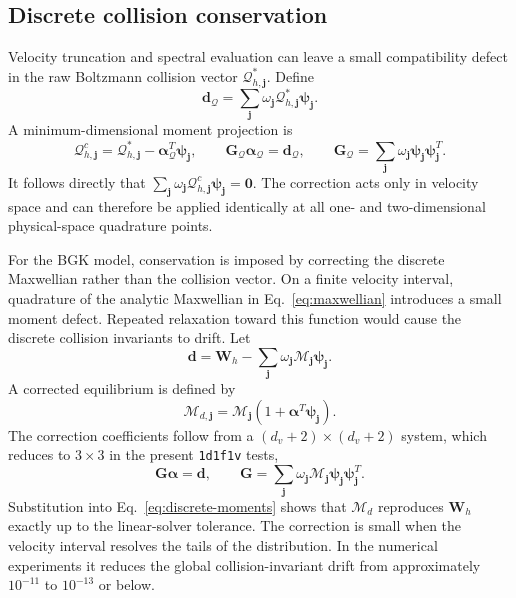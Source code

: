 \documentclass[preprint,3p,12pt]{elsarticle}
\newcommand{\vct}[1]{\boldsymbol{#1}}
\begin{document}
\subsection{Discrete collision conservation}
\label{sec:collision-conservation}

Velocity truncation and spectral evaluation can leave a small compatibility defect in the raw Boltzmann collision vector $\mathcal{Q}_{h,\vct{j}}^*$. Define
\begin{equation}
  \vct{d}_{\mathcal{Q}}
  =\sum_{\vct{j}}\omega_{\vct{j}}
  \mathcal{Q}_{h,\vct{j}}^*\vct{\psi}_{\vct{j}}.
  \label{eq:collision-defect}
\end{equation}
A minimum-dimensional moment projection is
\begin{equation}
  \mathcal{Q}_{h,\vct{j}}^c
  =\mathcal{Q}_{h,\vct{j}}^*
  -\vct{\alpha}_{\mathcal{Q}}^T\vct{\psi}_{\vct{j}},
  \qquad
  \vct{G}_{\mathcal{Q}}\vct{\alpha}_{\mathcal{Q}}
  =\vct{d}_{\mathcal{Q}},
  \qquad
  \vct{G}_{\mathcal{Q}}
  =\sum_{\vct{j}}\omega_{\vct{j}}
  \vct{\psi}_{\vct{j}}\vct{\psi}_{\vct{j}}^T.
  \label{eq:collision-projection}
\end{equation}
It follows directly that $\sum_{\vct{j}}\omega_{\vct{j}}\mathcal{Q}_{h,\vct{j}}^c\vct{\psi}_{\vct{j}}=\vct{0}$. The correction acts only in velocity space and can therefore be applied identically at all one- and two-dimensional physical-space quadrature points.

For the BGK model, conservation is imposed by correcting the discrete Maxwellian rather than the collision vector. On a finite velocity interval, quadrature of the analytic Maxwellian in Eq.~\eqref{eq:maxwellian} introduces a small moment defect. Repeated relaxation toward this function would cause the discrete collision invariants to drift. Let
\begin{equation}
  \vct{d}
  = \vct{W}_h
  -\sum_{\vct{j}}\omega_{\vct{j}}
  \mathcal{M}_{\vct{j}}\vct{\psi}_{\vct{j}}.
  \label{eq:moment-defect}
\end{equation}
A corrected equilibrium is defined by
\begin{equation}
  \mathcal{M}_{d,\vct{j}}
  = \mathcal{M}_{\vct{j}}
  \left(1+\vct{\alpha}^{T}\vct{\psi}_{\vct{j}}\right).
  \label{eq:discrete-maxwellian}
\end{equation}
The correction coefficients follow from a $(d_v+2)\times(d_v+2)$ system, which reduces to $3\times3$ in the present \texttt{1d1f1v} tests,
\begin{equation}
  \vct{G}\vct{\alpha}=\vct{d},
  \qquad
  \vct{G}=\sum_{\vct{j}}\omega_{\vct{j}}\mathcal{M}_{\vct{j}}
  \vct{\psi}_{\vct{j}}\vct{\psi}_{\vct{j}}^{T}.
  \label{eq:moment-correction}
\end{equation}
Substitution into Eq.~\eqref{eq:discrete-moments} shows that $\mathcal{M}_d$ reproduces $\vct{W}_h$ exactly up to the linear-solver tolerance. The correction is small when the velocity interval resolves the tails of the distribution. In the numerical experiments it reduces the global collision-invariant drift from approximately $10^{-11}$ to $10^{-13}$ or below.
\end{document}
